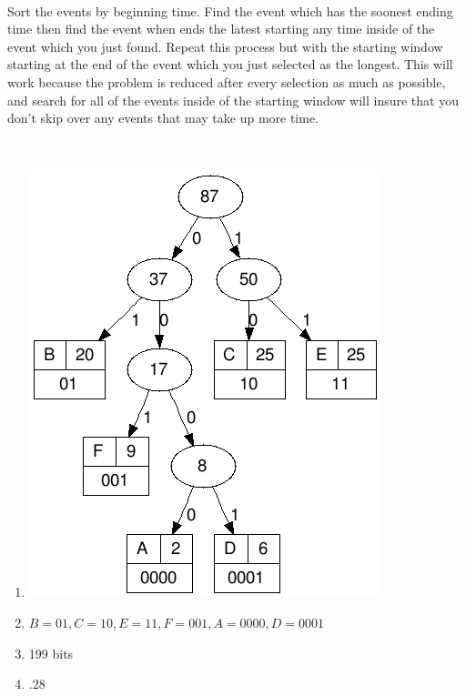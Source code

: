 \documentclass[11pt]{article}
\begin{document}
	\renewcommand{\headrulewidth}{0.4pt}
	\setlength{\headheight}{38.0pt}


	\\
	Sort the events by beginning time. Find the event which has the soonest ending time then find the event when ends the latest starting any time inside of the event which you just found. Repeat this process but with the starting window starting at the end of the event which you just selected as the longest. This will work because the problem is reduced after every selection as much as possible, and search for all of the events inside of the starting window will insure that you don't skip over any events that may take up more time.

	
	\\
	\begin{enumerate}
		\item \includegraphics[scale=.5]{problem2.png}\\
		\item $B =01, C = 10, E = 11, F = 001, A = 0000, D = 0001$ \\
		\item 199 bits \\
		\item $.28$
	\end{enumerate}
		
\end{document}
